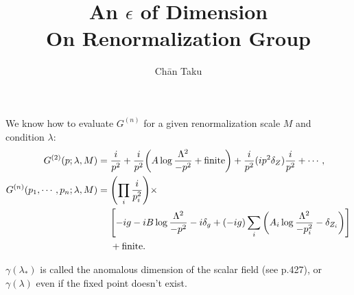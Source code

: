 \documentclass{article}
\title{An $\epsilon$ of Dimension\\
\large On Renormalization Group}
\author{Ch\=an Taku}
\begin{document}
\maketitle

We know how to evaluate $G^{(n)}$ for a given renormalization scale $M$ and condition $\lambda$:
\begin{align*}
    G^{(2)}(p;\lambda,M) &= \frac{i}{p^2} + \frac{i}{p^2}\qty(A \log \frac{\Lambda^2}{-p^2} + \text{finite}) + \frac{i}{p^2}(ip^2\delta_Z)\frac{i}{p^2} + \cdots,\\
    G^{(n)}(p_1,\cdots,p_n;\lambda,M) &= \qty(\prod_i \frac{i}{p_i^2}) \times\\
    &\phantom{{}={}}\qty[-ig - iB\log \frac{\Lambda^2}{-p^2} - i\delta_g + (-ig)\sum_i\qty(A_i \log \frac{\Lambda^2}{-p_i^2} - \delta_{Z_i})] \\
    &\phantom{{}={}} + \text{finite}.
\end{align*}

\par
$\gamma(\lambda_*)$ is called the anomalous dimension of the scalar field (see p.427), or $\gamma(\lambda)$ even if the fixed point doesn't exist.

% 
% 
\end{document}
